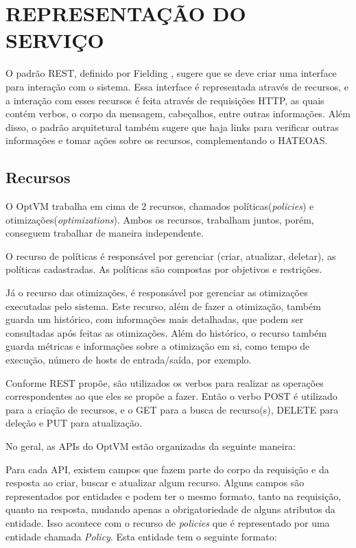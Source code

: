 \section{REPRESENTAÇÃO DO SERVIÇO}

O padrão REST, definido por Fielding \cite{fielding}, sugere que se deve criar uma interface para interação com o sistema. 
Essa interface é representada através de recursos, e a interação com esses recursos é feita através de requisições HTTP, 
as quais contém verbos, o corpo da mensagem, cabeçalhos, entre outras informações. Além disso, o padrão arquitetural também sugere que 
haja links para verificar outras informações e tomar ações sobre os recursos, complementando o HATEOAS.

\subsection{Recursos}

O OptVM trabalha em cima de 2 recursos, chamados políticas(\textit{policies}) e otimizações(\textit{optimizations}). 
Ambos os recursos, trabalham juntos, porém, conseguem trabalhar de maneira independente.

O recurso de políticas é responsável por gerenciar (criar, atualizar, deletar), as políticas
cadastradas. As políticas são compostas por objetivos e restrições. 

Já o recurso das otimizações, é responsável por gerenciar as otimizações executadas pelo sistema. Este recurso,
além de fazer a otimização, também guarda um histórico, com informações mais detalhadas, 
que podem ser consultadas após feitas as otimizações. Além do histórico, o recurso também guarda métricas e informações sobre
a otimização em si, como tempo de execução, número de hosts de entrada/saída, por exemplo.

Conforme REST propõe, são utilizados os verbos para realizar as operações correspondentes
ao que eles se propõe a fazer. Então o verbo POST é utilizado para a criação de recursos,
e o GET para a busca de recurso(s), DELETE para deleção e PUT para atualização.

No geral, as APIs do OptVM estão organizadas da seguinte maneira:





Para cada API, existem campos que fazem parte do corpo da requisição e da resposta
ao criar, buscar e atualizar algum recurso. Alguns campos são representados por entidades e 
podem ter o mesmo formato, tanto na requisição, quanto na resposta, mudando apenas
a obrigatoriedade de alguns atributos da entidade. Isso acontece
com o recurso de \textit{policies} que é representado por uma entidade chamada \textit{Policy}.
Esta entidade tem o seguinte formato:

